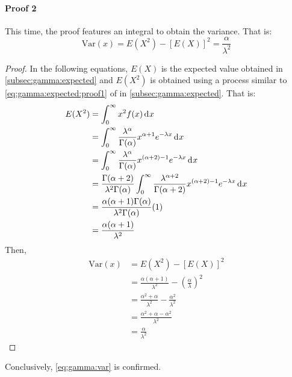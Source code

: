 \documentclass[12pt]{article}
\begin{document}
\paragraph{Proof 2}
This time, the proof features an integral to obtain the variance. That is:
\begin{equation}\label{eq:gamma:var:proof2}
	\text{Var}(x) = E(X^2)-[E(X)]^2 = \frac{\alpha}{\lambda^2}
\end{equation}
\begin{proof}
	In the following equations, $E(X)$ is the expected value obtained in \autoref{subsec:gamma:expected} and $E(X^2)$ is
	obtained using a process similar to \autoref{eq:gamma:expected:proof1} of  in
	\autoref{subsec:gamma:expected}. That is:
	\begin{equation}
		\begin{split}
			E(X^2)	&=	\int^\infty_0 x^2f(x)\mathop{}\!\mathrm{d^{}}x\\
					&=	\int^\infty_0 \frac{\lambda^\alpha}{\Gamma(\alpha)}x^{\alpha+1} e^{-\lambda x}\mathop{}\!\mathrm{d^{}}x\\
					&=	\int^\infty_0 \frac{\lambda^\alpha}{\Gamma(\alpha)}x^{(\alpha+2)-1} e^{-\lambda x}\mathop{}\!\mathrm{d^{}}x\\
					&=	\frac{\Gamma(\alpha+2)}{\lambda^2\Gamma(\alpha)} \int^\infty_0 \frac{\lambda^{\alpha+2}}{\Gamma(\alpha+2)}x^{(\alpha+2)-1} e^{-\lambda x}\mathop{}\!\mathrm{d^{}}x\\
					&=	\frac{\alpha(\alpha+1)\Gamma(\alpha)}{\lambda^2\Gamma(\alpha)}(1)\\
					&=	\frac{\alpha(\alpha+1)}{\lambda^2}
		\end{split}
	\end{equation}
	Then,
	\begin{equation}
		\begin{split}
			\text{Var}(x)	&=	E(X^2)-[E(X)]^2\\
							&=	\frac{\alpha(\alpha+1)}{\lambda^2} - \left(\frac{\alpha}{\lambda}\right)^2\\
							&=	\frac{\alpha^2+\alpha}{\lambda^2} - \frac{\alpha^2}{\lambda^2}\\
							&=	\frac{\alpha^2 + \alpha -\alpha^2}{\lambda^2}\\
							&=	\frac{\alpha}{\lambda^2}
		\end{split}
	\end{equation}
\end{proof}
Conclusively, \autoref{eq:gamma:var} is confirmed.

\end{document}
